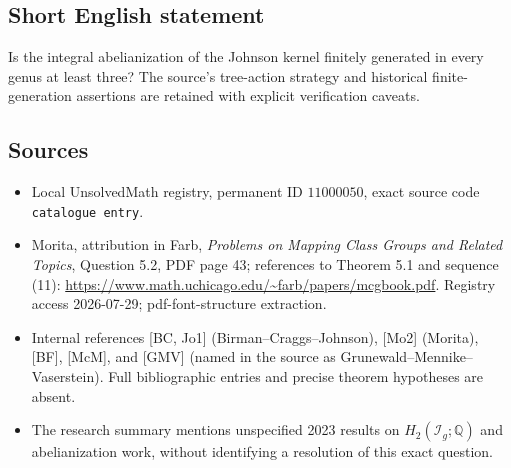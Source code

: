 \documentclass[11pt]{article}
\newcommand{\Q}{\mathbb{Q}}
\begin{document}
\subsection{Short English statement}
Is the integral abelianization of the Johnson kernel finitely generated in every genus at least three? The source's tree-action strategy and historical finite-generation assertions are retained with explicit verification caveats.
\subsection{Sources}
\begin{itemize}
\item Local UnsolvedMath registry, permanent ID \(11000050\), exact source code \texttt{catalogue entry}.
\item Morita, attribution in Farb, \emph{Problems on Mapping Class Groups and Related Topics}, Question 5.2, PDF page 43; references to Theorem 5.1 and sequence (11): \url{https://www.math.uchicago.edu/~farb/papers/mcgbook.pdf}. Registry access 2026-07-29; pdf-font-structure extraction.
\item Internal references [BC, Jo1] (Birman--Craggs--Johnson), [Mo2] (Morita), [BF], [McM], and [GMV] (named in the source as Grunewald--Mennike--Vaserstein). Full bibliographic entries and precise theorem hypotheses are absent.
\item The research summary mentions unspecified 2023 results on \(H_2(\mathcal I_g;\Q)\) and abelianization work, without identifying a resolution of this exact question.
\end{itemize}
\end{document}
